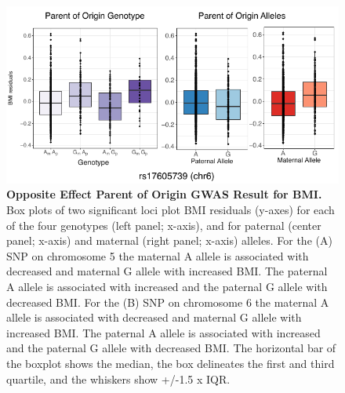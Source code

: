 \begin{figure}[!htb]
\centering \includegraphics[width=5in]{img/ch02/fig-04-bmi_oegwas.pdf}
\caption[Opposite Effect Parent of Origin GWAS Result for BMI.]{\textbf{Opposite Effect Parent of Origin GWAS Result for BMI.}  Box plots of two significant loci plot BMI residuals (y-axes) for each of the four genotypes (left panel; x-axis), and for paternal (center panel; x-axis) and maternal (right panel; x-axis) alleles. For the (A) SNP on chromosome 5 the maternal A allele is associated with decreased and maternal G allele with increased BMI. The paternal A allele is associated with increased and the paternal G allele with decreased BMI. For the (B) SNP on chromosome 6 the maternal A allele is associated with decreased and maternal G allele with increased BMI. The paternal A allele is associated with increased and the paternal G allele with decreased BMI. The horizontal bar of the boxplot shows the median, the box delineates the first and third quartile, and the whiskers show +/-1.5 x IQR.}
\label{fig:bmi_oegwas}
\end{figure}



